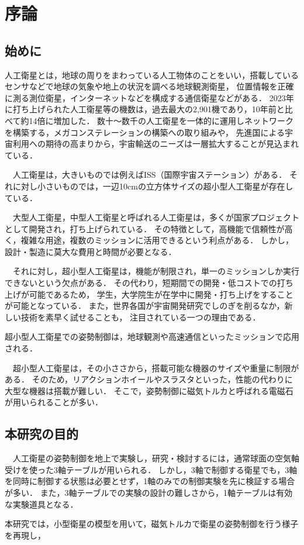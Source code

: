 \section{序論}
\subsection{始めに}
人工衛星とは，地球の周りをまわっている人工物体のことをいい，搭載しているセンサなどで地球の気象や地上の状況を調べる地球観測衛星，
位置情報を正確に測る測位衛星，インターネットなどを構成する通信衛星などがある．
2023年に打ち上げられた人工衛星等の機数は，過去最大の2,901機であり，10年前と比べて約14倍に増加した．
数十～数千の人工衛星を一体的に運用しネットワークを構築する，メガコンステレーションの構築への取り組みや，
先進国による宇宙利用への期待の高まりから，宇宙輸送のニーズは一層拡大することが見込まれている．

　人工衛星は，大きいものでは例えばISS（国際宇宙ステーション）がある．
それに対し小さいものでは，一辺10cmの立方体サイズの超小型人工衛星が存在している．

　大型人工衛星，中型人工衛星と呼ばれる人工衛星は，多くが国家プロジェクトとして開発され，打ち上げられている．
その特徴として，高機能で信頼性が高く，複雑な用途，複数のミッションに活用できるという利点がある．
しかし，設計・製造に莫大な費用と時間が必要となる．

　それに対し，超小型人工衛星は，機能が制限され，単一のミッションしか実行できないという欠点がある．
その代わり，短期間での開発・低コストでの打ち上げが可能であるため，
学生，大学院生が在学中に開発・打ち上げをすることが可能となっている．
また，世界各国が宇宙開発研究でしのぎを削るなか，新しい技術を素早く試せることも，
注目されている一つの理由である．

超小型人工衛星での姿勢制御は，地球観測や高速通信といったミッションで応用される．

　超小型人工衛星は，その小ささから，搭載可能な機器のサイズや重量に制限がある．
そのため，リアクションホイールやスラスタといった，性能の代わりに大型な機器は搭載が難しい．
そこで，姿勢制御に磁気トルカと呼ばれる電磁石が用いられることが多い．



\subsection{本研究の目的}
　人工衛星の姿勢制御を地上で実験し，研究・検討するには，通常球面の空気軸受けを使った3軸テーブルが用いられる．
しかし，3軸で制御する衛星でも，3軸を同時に制御する状態は必要とせず，1軸のみでの制御実験を先に検証する場合が多い．
また，3軸テーブルでの実験の設計の難しさから，1軸テーブルは有効な実験道具となる．

本研究では，小型衛星の模型を用いて，磁気トルカで衛星の姿勢制御を行う様子を再現し，